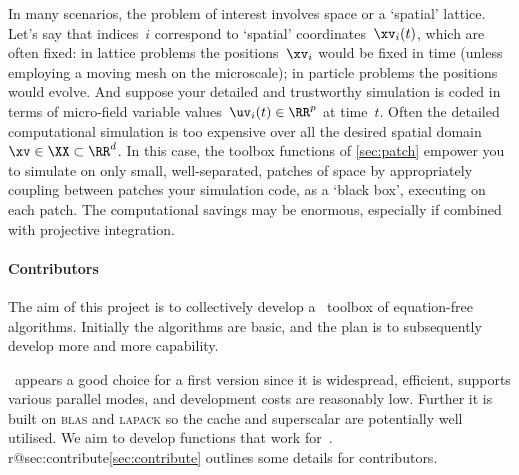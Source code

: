 In many scenarios, the problem of interest involves space or a `spatial' lattice.
Let's say that indices~\(i\) correspond to `spatial' coordinates~\(\xv_i(t)\), which are often fixed: in lattice problems the positions~\(\xv_i\) would be fixed in time (unless employing a moving mesh on the microscale); in particle problems the positions would evolve.
And suppose your detailed and trustworthy simulation is coded in terms of micro-field variable values~\(\uv_i(t)\in\RR^p\) at time~\(t\).
Often the detailed computational simulation is too expensive over all the desired spatial domain \(\xv\in\XX\subset\RR^{d}\).
In this case, the toolbox functions of \cref{sec:patch} empower you to simulate on only small, well-separated, patches of space by appropriately coupling between patches your simulation code, as a `black box', executing on each patch. 
The computational savings may be enormous, especially if combined with projective integration.



\paragraph{Contributors}
The aim of this project is to collectively develop a \script\ toolbox of equation-free algorithms.
Initially the algorithms are basic, and the plan is to subsequently develop more and more capability.

\Matlab\ appears a good choice for a first version since it is widespread, efficient, supports various parallel modes, and development costs are reasonably low.
Further it is built on \textsc{blas} and \textsc{lapack} so the cache and superscalar \cpu{} are potentially well utilised.
We aim to develop functions that work for~\script.
\ifcsname r@sec:contribute\endcsname\cref{sec:contribute} outlines some details for contributors.\fi






